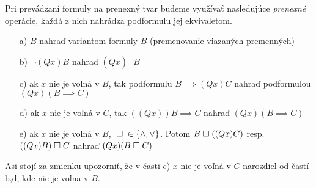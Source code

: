 Pri prevádzaní formuly na prenexný tvar budeme využívať nasledujúce
\emph{prenexné} operácie, každá z nich nahrádza podformulu
jej ekvivaletom.
\begin{itemize}
    \item[a)] $B$ nahraď variantom formuly $B$ (premenovanie viazaných
    premenných)
    \item[b)] $\neg(Q x) B$ nahraď $(\overline{Q} x) \neg B$
    \item[c)] ak $x$ nie je voľná v $B$, tak podformulu $B\implies (Qx)C$
            nahraď podformulou $(Qx) (B\implies C)$
    \item[d)] ak $x$ nie je voľná v $C$, tak $((Qx)) B \implies C$
        nahraď $(Qx) (B \implies C)$
    \item[e)] ak $x$ nie je voľná v $B$, $\;\square\; \in \{\land,\lor\}$.
     Potom $B \;\square\; ((Qx)C)$ resp. $((Qx)B)\;\square\; C$ nahraď
     $(Qx)(B \;\square\; C)$
\end{itemize}
\begin{poznamka}
    Asi stojí za zmienku upozorniť, že v časti c) $x$ nie je voľná v
    $C$ narozdiel od častí b,d, kde nie je voľna v $B$.
\end{poznamka}

